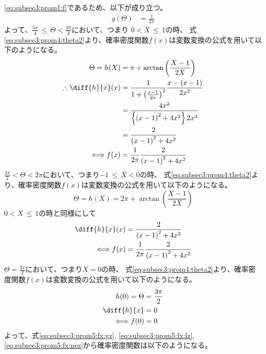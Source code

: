 \documentclass[dvipdfmx,titlepage, 11pt, a4paper]{jsarticle}%
\begin{document}
\begin{enumerate}[(1)]
    \eqref{eq:subsec3:prom1:f}であるため、以下が成り立つ。
    \begin{align*}
        g(\Theta) &= \frac{1}{2\pi}
    \end{align*}
    よって、$\frac{5\pi}{4}\, \leq\, \Theta < \frac{3\pi}{2}$において、つまり $0 < X\, \leq\, 1$の時、
    式\eqref{eq:subsec3:prom4:theta2}より、確率密度関数$f(x)$は変数変換の公式を用いて以下のようになる。
    \begin{align}
        \Theta = h(X) &= \pi + \arctan\left(\frac{X - 1}{2X}\right) \nonumber\\
        \therefore \diff{h}{x}(x) &= \frac{1}{1 + \left(\frac{x - 1}{2x}\right)^2}\frac{x - (x - 1)}{2x^2}\nonumber\\
        &= \frac{4x^2}{\left\{\left(x - 1\right)^2 + 4x^2\right\}2x^2}\nonumber\\
        &= \frac{2}{\left(x - 1\right)^2 + 4x^2}\nonumber\\
        \Longleftrightarrow f(x) &= \frac{1}{2\pi}\frac{2}{\left(x - 1\right)^2 + 4x^2}\label{eq:subsec3:prom5:fx:gz}
    \end{align}
    $\frac{3\pi}{2} < \Theta < 2\pi$において、つまり$-1\, \leq\, X < 0$の時、
    式\eqref{eq:subsec3:prom4:theta2}より、確率密度関数$f(x)$は変数変換の公式を用いて以下のようになる。
    \begin{equation*}
        \Theta = h(X) = 2\pi + \arctan\left(\frac{X - 1}{2X}\right)
    \end{equation*}
    $0 < X\, \leq\, 1$の時と同様にして
    \begin{align}
        \diff{h}{x}(x) &= \frac{2}{\left(x - 1\right)^2 + 4x^2}\nonumber\\
        \Longleftrightarrow f(x) &= \frac{1}{2\pi}\frac{2}{\left(x - 1\right)^2 + 4x^2}\label{eq:subsec3:prom5:fx:lz}
    \end{align}
    $\Theta = \frac{3\pi}{2}$において、つまり$X = 0$の時、
    式\eqref{eq:subsec3:prom4:theta2}より、確率密度関数$f(x)$は変数変換の公式を用いて以下のようになる。
    \begin{align}
        h(0) = \Theta &= \frac{3\pi}{2}\nonumber\\
        \diff{h}{x} &= 0\nonumber\\
        \Longleftrightarrow f(0) &= 0\label{eq:subsec3:prom5:fx:nez}
    \end{align}
    よって、式\eqref{eq:subsec3:prom5:fx:gz}, \eqref{eq:subsec3:prom5:fx:lz}, \eqref{eq:subsec3:prom5:fx:nez}から確率密度関数は以下のようになる。
    \begin{equation*}

\end{equation*}
\end{enumerate}
\end{document}
